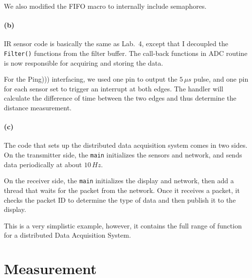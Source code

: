 \documentclass[a4paper]{article}
\begin{document}
We also modified the FIFO macro to internally include semaphores.



\paragraph{(b)} IR sensor code is basically the same as Lab.\ 4, except that I decoupled the \texttt{Filter()} functions
from the filter buffer. The call-back functions in ADC routine is now responsible for acquiring and storing the data.




For the Ping))) interfacing, we used one pin to output the $ 5 \, \mu s$ pulse, and one pin for each sensor set to
trigger an interrupt at both edges. The handler will calculate the difference of time between the two edges and thus
determine the distance measurement.




\paragraph{(c)} The code that sets up the distributed data acquisition system comes in two sides. On the transmitter side,
the \texttt{main} initializes the sensors and network, and sends data periodically at about $ 10 \, Hz $.



On the receiver side, the \texttt{main} initializes the display and network, then add a thread that waits for the packet
from the network. Once it receives a packet, it checks the packet ID to determine the type of data and then publish it
to the display.



This is a very simplistic example, however, it contains the full range of function for a distributed Data Acquisition System.

\section{Measurement}
\end{document}
